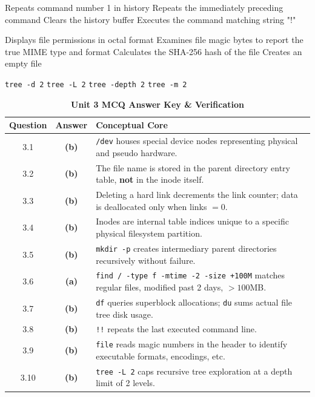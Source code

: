 {Repeats command number 1 in history}
{Repeats the immediately preceding command}
{Clears the history buffer}
{Executes the command matching string "!"}

{Displays file permissions in octal format}
{Examines file magic bytes to report the true MIME type and format}
{Calculates the SHA-256 hash of the file}
{Creates an empty file}

{\texttt{tree -d 2}}
{\texttt{tree -L 2}}
{\texttt{tree -depth 2}}
{\texttt{tree -m 2}}

\begin{table}[htbp]
\centering
\caption{\textbf{Unit 3 MCQ Answer Key \& Verification}}
\begin{tabularx}{0.85\linewidth}{c c X}
\toprule
\textbf{Question} & \textbf{Answer} & \textbf{Conceptual Core} \\
\midrule
3.1 & \textbf{(b)} & \texttt{/dev} houses special device nodes representing physical and pseudo hardware. \\
3.2 & \textbf{(b)} & The file name is stored in the parent directory entry table, \textbf{not} in the inode itself. \\
3.3 & \textbf{(b)} & Deleting a hard link decrements the link counter; data is deallocated only when links $=0$. \\
3.4 & \textbf{(b)} & Inodes are internal table indices unique to a specific physical filesystem partition. \\
3.5 & \textbf{(b)} & \texttt{mkdir -p} creates intermediary parent directories recursively without failure. \\
3.6 & \textbf{(a)} & \texttt{find / -type f -mtime -2 -size +100M} matches regular files, modified past 2 days, $>100$MB. \\
3.7 & \textbf{(b)} & \texttt{df} queries superblock allocations; \texttt{du} sums actual file tree disk usage. \\
3.8 & \textbf{(b)} & \texttt{!!} repeats the last executed command line. \\
3.9 & \textbf{(b)} & \texttt{file} reads magic numbers in the header to identify executable formats, encodings, etc. \\
3.10 & \textbf{(b)} & \texttt{tree -L 2} caps recursive tree exploration at a depth limit of 2 levels. \\
\bottomrule
\end{tabularx}
\end{table}

